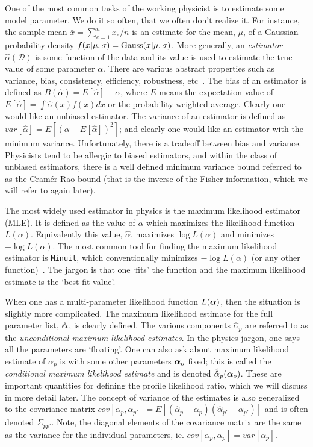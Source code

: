 \documentclass{cernrep}
\def\vec#1{\ifmmode
\mathchoice{\mbox{\boldmath$\displaystyle\bf#1$}}
{\mbox{\boldmath$\textstyle\bf#1$}}
{\mbox{\boldmath$\scriptstyle\bf#1$}}
{\mbox{\boldmath$\scriptscriptstyle\bf#1$}}\else
{\mbox{\boldmath$\bf#1$}}\fi}
\newcommand{\Gauss}{{\ensuremath{\rm Gauss}}}
\newcommand{\data}{{\ensuremath{\mathcal{D}}}}
\begin{document}
One of the most common tasks of the working physicist is to estimate some model parameter.  We do it so often, that we often don't realize it. For instance, the sample mean $\bar{x} = \sum_{e=1}^n x_e / n$ is an estimate for the mean, $\mu$,  of a Gaussian probability density $f(x|\mu,\sigma) =\Gauss(x|\mu,\sigma)$.  More generally, an \textit{estimator} $\hat{\alpha}(\data)$ is some function of the data and its value is used to estimate the true value of some parameter $\alpha$.  There are various abstract properties such as variance, bias, consistency, efficiency, robustness, etc~\cite{James}.  The bias of an estimator is defined as  $B(\hat\alpha) = E[ \hat\alpha ]-\alpha$, where $E$ means the expectation value of \mbox{$E[ \hat\alpha ]=\int\hat\alpha(x) f(x)dx$} or the probability-weighted average.  Clearly one would like an unbiased estimator. The variance of an estimator is defined as $var[\hat\alpha] = E[ (\alpha - E[\hat{\alpha}] )^2 ]$; and clearly one would like an estimator with the minimum variance.  Unfortunately, there is a tradeoff between bias and variance.  Physicists tend to be allergic to biased estimators, and within the class of unbiased estimators, there is a well defined minimum variance bound referred to as the Cram\'er-Rao bound (that is the inverse of the Fisher information, which we will refer to again later).  

The most widely used estimator in physics is the maximum likelihood estimator (MLE).  It is defined as the value of $\alpha$ which maximizes the likelihood function $L(\alpha)$.  Equivalently this value, $\hat{\alpha}$, maximizes $\log L(\alpha)$ and minimizes $-\log L(\alpha)$.  The most common tool for finding the maximum likelihood estimator is \texttt{Minuit}, which conventionally minimizes $-\log L(\alpha)$ (or any other function)~\cite{James:1975dr}.  The jargon is that one `fits' the function and the maximum likelihood estimate is the `best fit value'.  

When one has a multi-parameter likelihood function $L(\vec{\alpha})$, then the situation is slightly more complicated.  The maximum likelihood estimate for the full parameter list, $\hat{\vec{\alpha}}$, is clearly defined.  The various components $\hat{\alpha}_p$ are referred to as the \textit{unconditional maximum likelihood estimates}.  In the physics jargon, one says all the parameters are `floating'.  One can also ask about maximum likelihood estimate of $\alpha_p$ is with some other parameters $\vec{\alpha}_o$ fixed; this is called the \textit{conditional maximum likelihood estimate} and is denoted $\hat{\hat{\alpha}}_p(\vec{\alpha}_o)$.  These are important quantities for defining the profile likelihood ratio, which we will discuss in more detail later.  The concept of variance of the estimates is also generalized to the covariance matrix $cov[\alpha_p, \alpha_{p'}] = E[(\hat\alpha_p - \alpha_p)(\hat\alpha_{p'}- \alpha_{p'})]$ and is often denoted $\Sigma_{pp'}$.  Note, the diagonal elements of the covariance matrix are the same as the variance for the individual parameters, ie. $cov[\alpha_p, \alpha_{p}] = var[\alpha_p]$.
\end{document}
